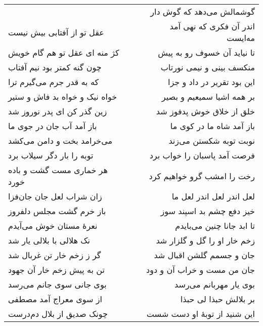 \begin{center}
\begin{longtable}{l p{0.5cm} r}
&&
گوشمالش می‌دهد که گوش دار
\\
عقل تو از آفتابی بیش نیست
&&
اندر آن فکری که نهی آمد مه‌ایست
\\
کژ منه ای عقل تو هم گام خویش
&&
تا نیاید آن خسوف رو به پیش
\\
چون گنه کمتر بود نیم آفتاب
&&
منکسف بینی و نیمی نورتاب
\\
که به قدر جرم می‌گیرم ترا
&&
این بود تقریر در داد و جزا
\\
خواه نیک و خواه بد فاش و ستیر
&&
بر همه اشیا سمیعیم و بصیر
\\
زین گذر کن ای پدر نوروز شد
&&
خلق از خلاق خوش پدفوز شد
\\
باز آمد آب جان در جوی ما
&&
باز آمد شاه ما در کوی ما
\\
می‌خرامد بخت و دامن می‌کشد
&&
نوبت توبه شکستن می‌زند
\\
توبه را بار دگر سیلاب برد
&&
فرصت آمد پاسبان را خواب برد
\\
هر خماری مست گشت و باده خورد
&&
رخت را امشب گرو خواهیم کرد
\\
زان شراب لعل جان جان‌فزا
&&
لعل اندر لعل اندر لعل ما
\\
باز خرم گشت مجلس دلفروز
&&
خیز دفع چشم بد اسپند سوز
\\
نعرهٔ مستان خوش می‌آیدم
&&
تا ابد جانا چنین می‌بایدم
\\
نک هلالی با بلالی یار شد
&&
زخم خار او را گل و گلزار شد
\\
گر ز زخم خار تن غربال شد
&&
جان و جسمم گلشن اقبال شد
\\
تن به پیش زخم خار آن جهود
&&
جان من مست و خراب آن و دود
\\
بوی جانی سوی جانم می‌رسد
&&
بوی یار مهربانم می‌رسد
\\
از سوی معراج آمد مصطفی
&&
بر بلالش حبذا لی حبذا
\\
چونک صدیق از بلال دم‌درست
&&
این شنید از توبهٔ او دست شست
\\
\end{longtable}
\end{center}
